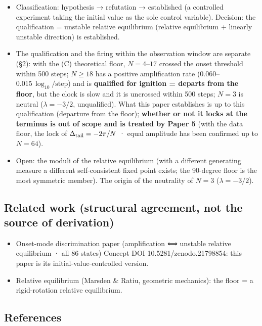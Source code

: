 \documentclass[
  a4paper,
]{ltjsarticle}
\providecommand{\tightlist}{%
  \setlength{\itemsep}{0pt}\setlength{\parskip}{0pt}}
\begin{document}
\begin{itemize}
\tightlist
\item
  Classification: hypothesis → refutation → established (a controlled
  experiment taking the initial value as the sole control variable).
  Decision: the qualification = unstable relative equilibrium (relative
  equilibrium + linearly unstable direction) is established.
\item
  The qualification and the firing within the observation window are
  separate (§2): with the (C) theoretical floor, \(N=4\)--\(17\) crossed
  the onset threshold within 500 steps; \(N\ge18\) has a positive
  amplification rate (\(0.060\)--\(0.015\,\log_{10}/\text{step}\)) and
  is \textbf{qualified for ignition = departs from the floor}, but the
  clock is slow and it is uncrossed within 500 steps; \(N=3\) is neutral
  (\(\lambda=-3/2\), unqualified). What this paper establishes is up to
  this qualification (departure from the floor); \textbf{whether or not
  it locks at the terminus is out of scope and is treated by Paper 5}
  (with the data floor, the lock of \(\Delta_{\rm tail}=-2\pi/N\) ·
  equal amplitude has been confirmed up to \(N=64\)).
\item
  Open: the moduli of the relative equilibrium (with a different
  generating measure a different self-consistent fixed point exists; the
  90-degree floor is the most symmetric member). The origin of the
  neutrality of \(N=3\) (\(\lambda=-3/2\)).
\end{itemize}

\subsection{Related work (structural agreement, not the source of
derivation)}\label{related-work-structural-agreement-not-the-source-of-derivation}

\begin{itemize}
\tightlist
\item
  Onset-mode discrimination paper (amplification ⟺ unstable relative
  equilibrium · all 86 states) Concept DOI 10.5281/zenodo.21798854: this
  paper is its initial-value-controlled version.
\item
  Relative equilibrium (Marsden \& Ratiu, geometric mechanics): the
  floor = a rigid-rotation relative equilibrium.
\end{itemize}

\subsection{References}\label{references}
\end{document}
